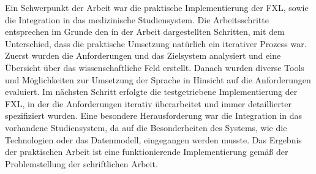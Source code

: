 Ein Schwerpunkt der Arbeit war die praktische Implementierung der FXL, sowie die Integration in das medizinische Studiensystem. Die Arbeitsschritte entsprechen im Grunde den in der Arbeit dargestellten Schritten, mit dem Unterschied, dass die praktische Umsetzung natürlich ein iterativer Prozess war. Zuerst wurden die Anforderungen und das Zielsystem analysiert und eine Übersicht über das wissenschaftliche Feld erstellt. Danach wurden diverse Tools und Möglichkeiten zur Umsetzung der Sprache in Hinsicht auf die Anforderungen evaluiert. Im nächsten Schritt erfolgte die testgetriebene Implementierung der FXL, in der die Anforderungen iterativ überarbeitet und immer detaillierter spezifiziert wurden. Eine besondere Herausforderung war die Integration in das vorhandene Studiensystem, da auf die Besonderheiten des Systems, wie die Technologien oder das Datenmodell, eingegangen werden musste. Das Ergebnis der praktischen Arbeit ist eine funktionierende Implementierung gemäß der Problemstellung der schriftlichen Arbeit.



